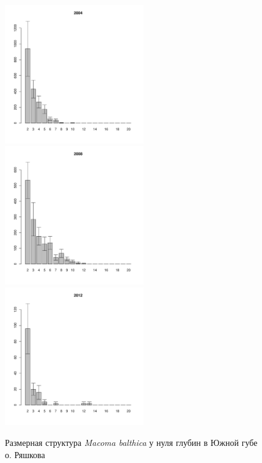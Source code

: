 \documentclass[12pt, a4paper]{article}
\begin{document}
\begin{figure}[h]
\begin{multicols}{3}
\hfill
\includegraphics[width=60mm]{../White_Sea/Ryashkov_YuG/YuG2_2004_.pdf}
\hfill
\includegraphics[width=60mm]{../White_Sea/Ryashkov_YuG/YuG2_2008_.pdf}
\hfill
\includegraphics[width=60mm]{../White_Sea/Ryashkov_YuG/YuG2_2012_.pdf}
\end{multicols}


\caption{Размерная структура {\it Macoma balthica} у нуля глубин в Южной губе о. Ряшкова}
\label{ris:size_str_YuG}
\end{figure}
\end{document}
